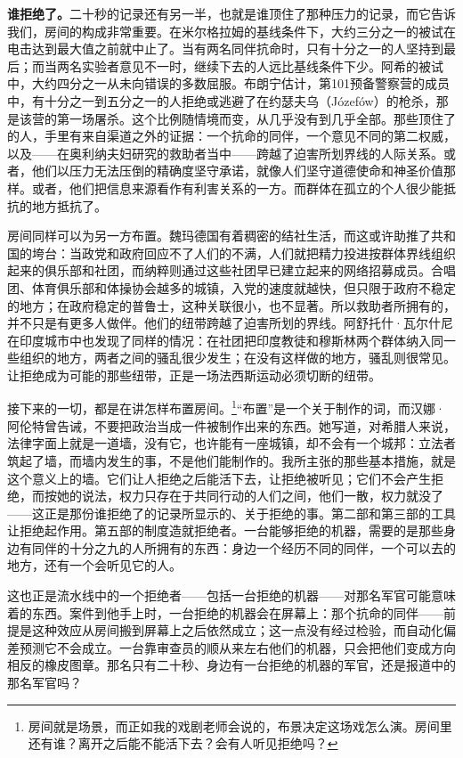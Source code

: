 \textbf{谁拒绝了。}二十秒的记录还有另一半，也就是谁顶住了那种压力的记录，而它告诉我们，房间的构成非常重要。在米尔格拉姆的基线条件下，大约三分之一的被试在电击达到最大值之前就中止了。当有两名同伴抗命时，只有十分之一的人坚持到最后；而当两名实验者意见不一时，继续下去的人远比基线条件下少\autocite{milgram1974obedience}。阿希的被试中，大约四分之一从未向错误的多数屈服\autocite{asch1956studies}。布朗宁估计，第101预备警察营的成员中，有十分之一到五分之一的人拒绝或逃避了在约瑟夫乌（Józefów）的枪杀，那是该营的第一场屠杀\autocite{browning1992ordinary}。这个比例随情境而变，从几乎没有到几乎全部。那些顶住了的人，手里有来自渠道之外的证据：一个抗命的同伴，一个意见不同的第二权威，以及——在奥利纳夫妇研究的救助者当中——跨越了迫害所划界线的人际关系\autocite{oliner1988altruistic}。或者，他们以压力无法压倒的精确度坚守承诺，就像人们坚守道德使命和神圣价值那样\autocite{skitka2009limits,ginges2007sacred}。或者，他们把信息来源看作有利害关系的一方。而群体在孤立的个人很少能抵抗的地方抵抗了\autocite{gamson1982encounters}。

房间同样可以为另一方布置。魏玛德国有着稠密的结社生活，而这或许助推了共和国的垮台：当政党和政府回应不了人们的不满，人们就把精力投进按群体界线组织起来的俱乐部和社团，而纳粹则通过这些社团早已建立起来的网络招募成员\autocite{berman1997weimar}。合唱团、体育俱乐部和体操协会越多的城镇，入党的速度就越快，但只限于政府不稳定的地方；在政府稳定的普鲁士，这种关联很小，也不显著\autocite{satyanath2017bowling}。所以救助者所拥有的，并不只是有更多人做伴。他们的纽带跨越了迫害所划的界线。阿舒托什·瓦尔什尼在印度城市中也发现了同样的情况：在社团把印度教徒和穆斯林两个群体纳入同一些组织的地方，两者之间的骚乱很少发生；在没有这样做的地方，骚乱则很常见\autocite{varshney2002ethnic}。让拒绝成为可能的那些纽带，正是一场法西斯运动必须切断的纽带。

接下来的一切，都是在讲怎样布置房间。\footnote{房间就是场景，而正如我的戏剧老师会说的，布景决定这场戏怎么演。房间里还有谁？离开之后能不能活下去？会有人听见拒绝吗？}“布置”是一个关于制作的词，而汉娜·阿伦特曾告诫，不要把政治当成一件被制作出来的东西。她写道，对希腊人来说，法律字面上就是一道墙，没有它，也许能有一座城镇，却不会有一个城邦\autocite{arendt1958human}：立法者筑起了墙，而墙内发生的事，不是他们能制作的。我所主张的那些基本措施，就是这个意义上的墙。它们让人拒绝之后能活下去，让拒绝被听见；它们不会产生拒绝，而按她的说法，权力只存在于共同行动的人们之间，他们一散，权力就没了——这正是那份谁拒绝了的记录所显示的、关于拒绝的事。第二部和第三部的工具让拒绝起作用。第五部的制度造就拒绝者。一台能够拒绝的机器，需要的是那些身边有同伴的十分之九的人所拥有的东西：身边一个经历不同的同伴，一个可以去的地方，还有一个会听见它的人。

这也正是流水线中的一个拒绝者——包括一台拒绝的机器——对那名军官可能意味着的东西。案件到他手上时，一台拒绝的机器会在屏幕上：那个抗命的同伴——前提是这种效应从房间搬到屏幕上之后依然成立；这一点没有经过检验，而自动化偏差预测它不会成立。一台靠审查员的顺从来左右他们的机器，只会把他们变成方向相反的橡皮图章。那名只有二十秒、身边有一台拒绝的机器的军官，还是报道中的那名军官吗？
